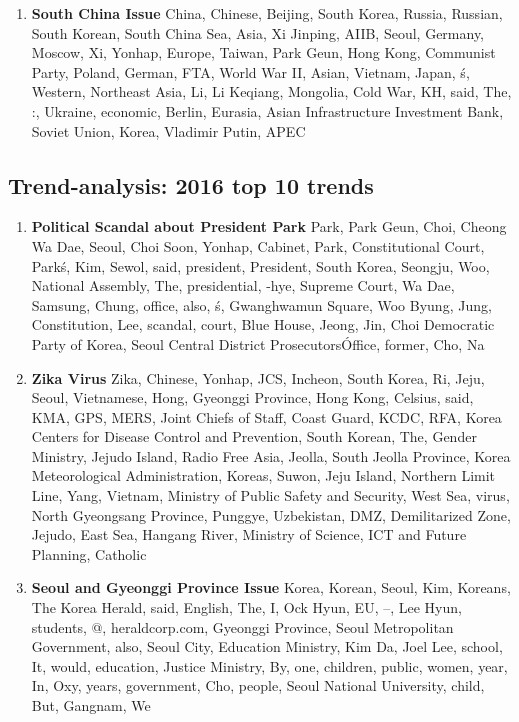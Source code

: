 \begin{enumerate}
  \item \textbf{South China Issue} China, Chinese, Beijing, South Korea, Russia, Russian, South Korean, South China Sea, Asia, Xi Jinping, AIIB, Seoul, Germany, Moscow, Xi, Yonhap, Europe, Taiwan, Park Geun, Hong Kong, Communist Party, Poland, German, FTA, World War II, Asian, Vietnam, Japan, \'s, Western, Northeast Asia, Li, Li Keqiang, Mongolia, Cold War, KH, said, The, :, Ukraine, economic, Berlin, Eurasia, Asian Infrastructure Investment Bank, Soviet Union, Korea, Vladimir Putin, APEC
\end{enumerate}
\subsection{Trend-analysis: 2016 top 10 trends}
\begin{enumerate}
  \item \textbf{Political Scandal about President Park} Park, Park Geun, Choi, Cheong Wa Dae, Seoul, Choi Soon, Yonhap, Cabinet, Park, Constitutional Court, Park\'s, Kim, Sewol, said, president, President, South Korea, Seongju, Woo, National Assembly, The, presidential, -hye, Supreme Court, Wa Dae, Samsung, Chung, office, also, \'s, Gwanghwamun Square, Woo Byung, Jung, Constitution, Lee, scandal, court, Blue House, Jeong, Jin, Choi Democratic Party of Korea, Seoul Central District Prosecutors\' Office, former, Cho, Na
  \item \textbf{Zika Virus} Zika, Chinese, Yonhap, JCS, Incheon, South Korea, Ri, Jeju, Seoul, Vietnamese, Hong, Gyeonggi Province, Hong Kong, Celsius, said, KMA, GPS, MERS, Joint Chiefs of Staff, Coast Guard, KCDC, RFA, Korea Centers for Disease Control and Prevention, South Korean, The, Gender Ministry, Jejudo Island, Radio Free Asia, Jeolla, South Jeolla Province, Korea Meteorological Administration, Koreas, Suwon, Jeju Island, Northern Limit Line, Yang, Vietnam, Ministry of Public Safety and Security, West Sea, virus, North Gyeongsang Province, Punggye, Uzbekistan, DMZ, Demilitarized Zone, Jejudo, East Sea, Hangang River, Ministry of Science, ICT and Future Planning, Catholic
  \item \textbf{Seoul and Gyeonggi Province Issue} Korea, Korean, Seoul, Kim, Koreans, The Korea Herald, said, English, The, I, Ock Hyun, EU, --, Lee Hyun, students, @, heraldcorp.com, Gyeonggi Province, Seoul Metropolitan Government, also, Seoul City, Education Ministry, Kim Da, Joel Lee, school, It, would, education, Justice Ministry, By, one, children, public, women, year, In, Oxy, years, government, Cho, people, Seoul National University, child, But, Gangnam, We

\end{enumerate}
